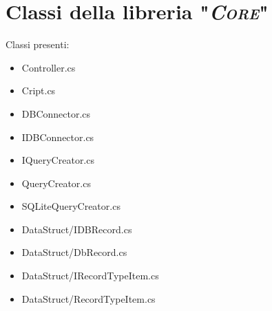 \documentclass[a4paper,10pt]{report}
\begin{document}
	\section{Classi della libreria "{\scshape\itshape Core}"}
    Classi presenti:
		\begin{multicols}{2}
			\begin{itemize}
				\item Controller.cs
				\item Cript.cs
				\item DBConnector.cs
				\item IDBConnector.cs
				\item IQueryCreator.cs
				\item QueryCreator.cs
				\item SQLiteQueryCreator.cs
				\item DataStruct/IDBRecord.cs
				\item DataStruct/DbRecord.cs
				\item DataStruct/IRecordTypeItem.cs
				\item DataStruct/RecordTypeItem.cs
			\end{itemize}
			\end{multicols}
		\newpage
		
		
		
		
		
		
		
		
		
		
		
	\newpage
\end{document}

